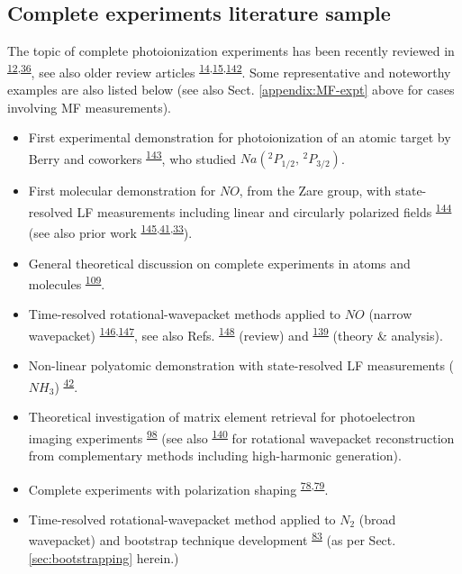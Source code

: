 \documentclass[10pt]{article}
\begin{document}
\subsection{Complete experiments literature sample\label{sec:CompleteLit}}


The topic of complete photoionization experiments has been recently reviewed in \textsuperscript{\hyperref[csl:12]{12},\hyperref[csl:36]{36}}, see also older review articles \textsuperscript{\hyperref[csl:14]{14},\hyperref[csl:15]{15},\hyperref[csl:142]{142}}. Some representative and noteworthy examples are also listed below (see also Sect. \ref{appendix:MF-expt} above for cases involving MF measurements).

\begin{itemize}
\item First experimental demonstration for photoionization of an atomic target by Berry and coworkers \textsuperscript{\hyperref[csl:143]{143}}, who studied
$Na(^{2}P_{1/2},\,^{2}P_{3/2})$.
\item First molecular demonstration for $NO$, from the Zare group, with state-resolved LF measurements including linear and circularly polarized fields \textsuperscript{\hyperref[csl:144]{144}} (see also prior work \textsuperscript{\hyperref[csl:145]{145},\hyperref[csl:41]{41},\hyperref[csl:33]{33}}).
\item General theoretical discussion on complete experiments in atoms and molecules \textsuperscript{\hyperref[csl:109]{109}}.
\item Time-resolved rotational-wavepacket methods applied to $NO$ (narrow wavepacket) \textsuperscript{\hyperref[csl:146]{146},\hyperref[csl:147]{147}}, see also Refs. \textsuperscript{\hyperref[csl:148]{148}} (review) and \textsuperscript{\hyperref[csl:139]{139}} (theory \& analysis).
\item Non-linear polyatomic demonstration with state-resolved LF measurements ($NH_3$) \textsuperscript{\hyperref[csl:42]{42}}.
\item Theoretical investigation of matrix element retrieval for photoelectron imaging experiments \textsuperscript{\hyperref[csl:98]{98}} (see also \textsuperscript{\hyperref[csl:140]{140}} for rotational wavepacket reconstruction from complementary methods including high-harmonic generation).  
\item Complete experiments with polarization shaping \textsuperscript{\hyperref[csl:78]{78},\hyperref[csl:79]{79}}.
\item Time-resolved rotational-wavepacket method applied to $N_2$ (broad wavepacket) and bootstrap technique development \textsuperscript{\hyperref[csl:83]{83}} (as per Sect. \ref{sec:bootstrapping} herein.)
\end{itemize} 
\end{document}
